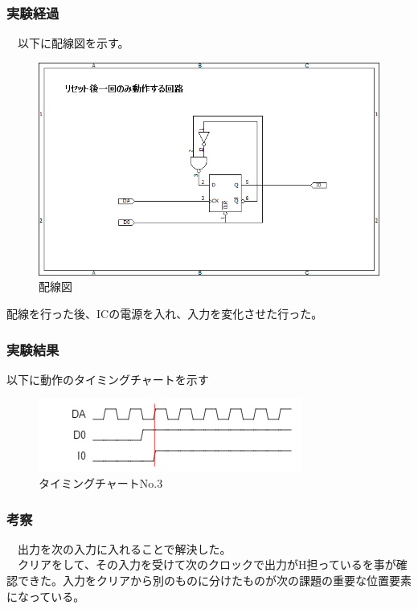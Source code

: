 \documentclass{scrartcl}
\begin{document}
\subsubsection{実験経過}
\label{sec:orgc742a7e}
　以下に配線図を示す。\\
\begin{figure}[htbp]
\centering
\includegraphics[width=.9\linewidth]{./logice-3.png}
\caption{\label{fig:org52439b6}
配線図}
\end{figure}
配線を行った後、ICの電源を入れ、入力を変化させた行った。\\
\subsubsection{実験結果}
\label{sec:org7bb37c5}
以下に動作のタイミングチャートを示す\\
\begin{figure}[htbp]
\centering
\includegraphics[width=.9\linewidth]{./logictime-3.png}
\caption{\label{fig:org7ce3630}
タイミングチャートNo.3}
\end{figure}
\subsubsection{考察}
\label{sec:orga688ef5}
　出力を次の入力に入れることで解決した。\\
　クリアをして、その入力を受けて次のクロックで出力がH担っているを事が確認できた。入力をクリアから別のものに分けたものが次の課題の重要な位置要素になっている。\\
\end{document}
